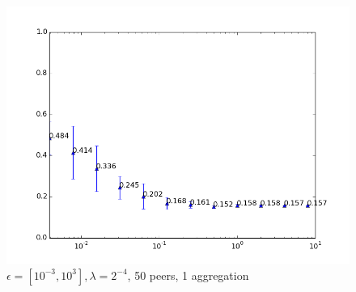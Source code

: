 \begin{figure}[H]
	\centering
	\includegraphics[width=\textwidth]{fig/spambase/eps2e-8-2e8,budg=eps,peers10,groups10,reg2e-2-data368-pubAll-spam-baseline-testset}
	\caption{$\epsilon = [10^{-3}, 10^{3}], \lambda = 2^{-4}$, 50 peers, 1 aggregation}
	\label{fig:epsilon_big_range}
\end{figure}

